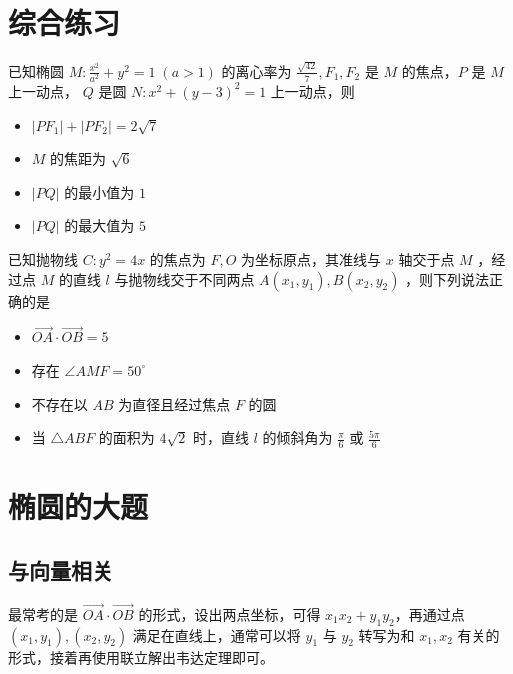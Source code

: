 \section{综合练习}

\begin{problem}
已知椭圆 $M: \frac{x^{2}}{a^{2}}+y^{2}=1\;(a>1)$ 的离心率为 $\frac{\sqrt{42}}{7}, F_{1}, F_{2}$ 是 $M$ 的焦点，$P$ 是 $M$ 上一动点， $Q$ 是圆 $N: x^{2}+(y-3)^{2}=1$ 上一动点，则
\begin{itemize}
    \item $|PF_{1}|+|PF_{2}|=2 \sqrt{7}$
    \item $M$ 的焦距为 $\sqrt{6}$
    \item $|PQ|$ 的最小值为 $1$
    \item $|PQ|$ 的最大值为 $5$
\end{itemize}
\end{problem}

\vspace{1em}

\begin{problem}
已知抛物线 $C: y^{2}=4x$ 的焦点为 $F, O$ 为坐标原点，其准线与 $x$ 轴交于点 $M$ ，经过点 $M$ 的直线 $l$ 与抛物线交于不同两点 $A(x_{1}, y_{1}), B(x_{2}, y_{2})$ ，则下列说法正确的是
\begin{itemize}
    \item $\overrightarrow{OA} \cdot \overrightarrow{OB}=5$
    \item 存在 $\angle AMF=50^{\circ}$
    \item 不存在以 $AB$ 为直径且经过焦点 $F$ 的圆
    \item 当 $\triangle ABF$ 的面积为 $4 \sqrt{2}$ 时，直线 $l$ 的倾斜角为 $\frac{\pi}{6}$ 或 $\frac{5 \pi}{6}$
\end{itemize}
\end{problem}

\section{椭圆的大题}

\subsection{与向量相关}

\begin{tips}
    最常考的是 $\overrightarrow{OA} \cdot \overrightarrow{OB}$ 的形式，设出两点坐标，可得 $x_1x_2 + y_1y_2$，再通过点 $(x_1, y_1), (x_2, y_2)$ 满足在直线上，通常可以将 $y_1$ 与 $y_2$ 转写为和 $x_1, x_2$ 有关的形式，接着再使用联立解出韦达定理即可。
\end{tips}

